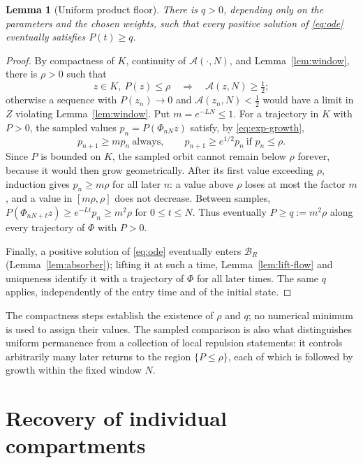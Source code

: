 \documentclass[11pt,a4paper]{article}
\theoremstyle{plain}
\newtheorem{lemma}[theorem]{Lemma}
\theoremstyle{definition}
\theoremstyle{remark}
\newcommand{\cA}{\mathcal A}
\newcommand{\cB}{\mathcal B}
\begin{document}
\begin{lemma}[Uniform product floor]\label{lem:product-floor}
There is $q>0$, depending only on the parameters and the chosen weights, such that every positive solution of \eqref{eq:ode} eventually satisfies $P(t)\ge q$.
\end{lemma}
\begin{proof}
By compactness of $K$, continuity of $\cA(\cdot,N)$, and Lemma~\ref{lem:window}, there is $\rho>0$ such that
\[
 z\in K,\ P(z)\le\rho\quad\Longrightarrow\quad\cA(z,N)\ge\tfrac12 ;
\]
otherwise a sequence with $P(z_n)\to0$ and $\cA(z_n,N)<\tfrac12$ would have a limit in $Z$ violating Lemma~\ref{lem:window}. Put $m=e^{-LN}\le1$. For a trajectory in $K$ with $P>0$, the sampled values $p_n=P(\Phi_{nN}z)$ satisfy, by \eqref{eq:exp-growth},
\[
 p_{n+1}\ge mp_n\ \text{always},\qquad p_{n+1}\ge e^{1/2}p_n\ \text{if }p_n\le\rho .
\]
Since $P$ is bounded on $K$, the sampled orbit cannot remain below $\rho$ forever, because it would then grow geometrically. After its first value exceeding $\rho$, induction gives $p_n\ge m\rho$ for all later $n$: a value above $\rho$ loses at most the factor $m$, and a value in $[m\rho,\rho]$ does not decrease. Between samples, $P(\Phi_{nN+t}z)\ge e^{-Lt}p_n\ge m^2\rho$ for $0\le t\le N$. Thus eventually $P\ge q:=m^2\rho$ along every trajectory of $\Phi$ with $P>0$.

Finally, a positive solution of \eqref{eq:ode} eventually enters $\cB_R$ (Lemma~\ref{lem:absorber}); lifting it at such a time, Lemma~\ref{lem:lift-flow} and uniqueness identify it with a trajectory of $\Phi$ for all later times. The same $q$ applies, independently of the entry time and of the initial state.
\end{proof}

The compactness steps establish the existence of $\rho$ and $q$; no numerical minimum is used to assign their values. The sampled comparison is also what distinguishes uniform permanence from a collection of local repulsion statements: it controls arbitrarily many later returns to the region $\{P\le\rho\}$, each of which is followed by growth within the fixed window $N$.

\section{Recovery of individual compartments}\label{sec:recovery}
\end{document}
